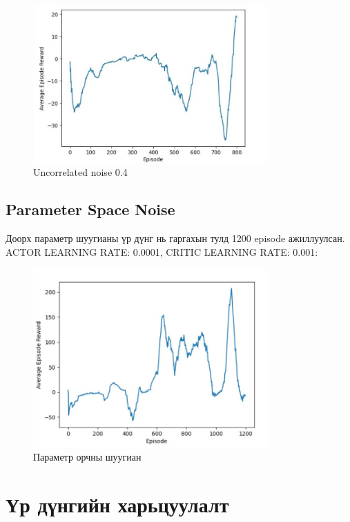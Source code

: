 \documentclass[12pt,A4]{report}
\begin{document}
\begin{figure}[H]
\centering
\includegraphics[width=0.8\textwidth]{./images/after_800_ep_04}
\caption{Uncorrelated noise 0.4}
\end{figure}

\subsection{Parameter Space Noise}

Доорх параметр шуугианы үр дүнг нь гаргахын тулд 1200 episode ажиллуулсан. ACTOR LEARNING RATE: 0.0001, CRITIC LEARNING RATE: 0.001:

\begin{figure}[H]
\centering
\includegraphics[width=0.8\textwidth]{./images/PSN_a-lr-0-0001_c-lr-0-001_1200ep}
\caption{Параметр орчны шуугиан}
\end{figure}

\section{Үр дүнгийн харьцуулалт}
\end{document}
